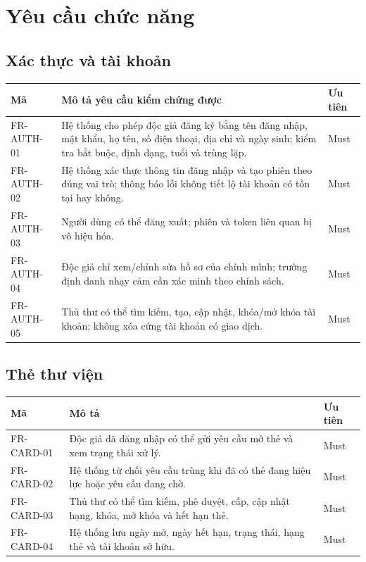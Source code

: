 \documentclass[12pt,a4paper,oneside]{report}
\begin{document}
\chapter{Yêu cầu chức năng}
\section{Xác thực và tài khoản}
\begin{longtable}{L{2.2cm}L{9.9cm}L{2.2cm}}
\toprule Mã & Mô tả yêu cầu kiểm chứng được & Ưu tiên\\\midrule\endhead
FR-AUTH-01 & Hệ thống cho phép độc giả đăng ký bằng tên đăng nhập, mật khẩu, họ tên, số điện thoại, địa chỉ và ngày sinh; kiểm tra bắt buộc, định dạng, tuổi và trùng lặp. & Must\\
FR-AUTH-02 & Hệ thống xác thực thông tin đăng nhập và tạo phiên theo đúng vai trò; thông báo lỗi không tiết lộ tài khoản có tồn tại hay không. & Must\\
FR-AUTH-03 & Người dùng có thể đăng xuất; phiên và token liên quan bị vô hiệu hóa. & Must\\
FR-AUTH-04 & Độc giả chỉ xem/chỉnh sửa hồ sơ của chính mình; trường định danh nhạy cảm cần xác minh theo chính sách. & Must\\
FR-AUTH-05 & Thủ thư có thể tìm kiếm, tạo, cập nhật, khóa/mở khóa tài khoản; không xóa cứng tài khoản có giao dịch. & Must\\
\bottomrule
\end{longtable}

\section{Thẻ thư viện}
\begin{longtable}{L{2.2cm}L{9.9cm}L{2.2cm}}
\toprule Mã & Mô tả & Ưu tiên\\\midrule\endhead
FR-CARD-01 & Độc giả đã đăng nhập có thể gửi yêu cầu mở thẻ và xem trạng thái xử lý. & Must\\
FR-CARD-02 & Hệ thống từ chối yêu cầu trùng khi đã có thẻ đang hiệu lực hoặc yêu cầu đang chờ. & Must\\
FR-CARD-03 & Thủ thư có thể tìm kiếm, phê duyệt, cấp, cập nhật hạng, khóa, mở khóa và hết hạn thẻ. & Must\\
FR-CARD-04 & Hệ thống lưu ngày mở, ngày hết hạn, trạng thái, hạng thẻ và tài khoản sở hữu. & Must\\
\bottomrule
\end{longtable}
\end{document}
